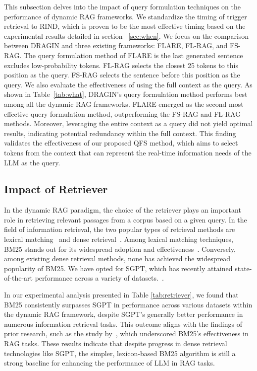 This subsection delves into the impact of query formulation techniques on the performance of dynamic RAG frameworks.
We standardize the timing of trigger retrieval to RIND, which is proven to be the most effective timing based on the experimental results detailed in section ~\ref{sec:when}.
We focus on the comparison between DRAGIN and three existing frameworks: FLARE, FL-RAG, and FS-RAG.
The query formulation method of FLARE is the last generated sentence excludes low-probability tokens.
FL-RAG selects the closest 25 tokens to this position as the query.
FS-RAG selects the sentence before this position as the query.
We also evaluate the effectiveness of using the full context as the query.
As shown in Table~\ref{tab:what}, DRAGIN's query formulation method performs best among all the dynamic RAG frameworks.
FLARE emerged as the second most effective query formulation method, outperforming the FS-RAG and FL-RAG methods.
Moreover, leveraging the entire context as a query did not yield optimal results, indicating potential redundancy within the full context. This finding validates the effectiveness of our proposed QFS method, which aims to select tokens from the context that can represent the real-time information needs of the LLM as the query.

\subsection{Impact of Retriever}
\label{sec:SGPT}
In the dynamic RAG paradigm, the choice of the retriever plays an important role in retrieving relevant passages from a corpus based on a given query. 
In the field of information retrieval, the two popular types of retrieval methods are lexical matching~\cite{zhai2008statistical,robertson2009probabilistic} and dense retrieval~\cite{su2023caseformer,gao2021condenser,su2023wikiformer,muennighoff2022sgpt,li2023thuir,ma2023caseencoder,ye2024relevance,su2023thuir2,li2023towards,chen2023thuir,chen2022web,li2023thuir3,fang2024scaling}.
Among lexical matching techniques, BM25 stands out for its widespread adoption and effectiveness~\cite{robertson2009probabilistic}. Conversely, among existing dense retrieval methods, none has achieved the widespread popularity of BM25. We have opted for SGPT, which has recently attained state-of-the-art performance across a variety of datasets.~\cite{muennighoff2022sgpt}.

In our experimental analysis presented in Table \ref{tab:retriever}, we found that BM25 consistently surpasses SGPT in performance across various datasets within the dynamic RAG framework, despite SGPT's generally better performance in numerous information retrieval tasks. This outcome aligns with the findings of prior research, such as the study by~\cite{ram2023context}, which underscored BM25's effectiveness in RAG tasks. These results indicate that despite progress in dense retrieval technologies like SGPT, the simpler, lexicon-based BM25 algorithm is still a strong baseline for enhancing the performance of LLM in RAG tasks.

